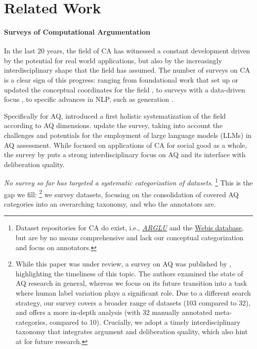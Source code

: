 \section{Related Work}
\label{sec:relatedwork}

\paragraph{Surveys of Computational Argumentation}

In the last 20 years, the field of CA has witnessed a constant development driven by the potential for real world applications, but also by the increasingly interdisciplinary shape that the field has assumed. The number of  surveys on CA is a clear sign of this progress: ranging from foundational work that set up or updated the conceptual coordinates for the field \cite{peldszus2013argument,stede_argumentation_2019,lawrence2020survey,lauscher2022survey}, to surveys with a data-driven focus \cite{cabrio2018survey,SchaeferStede+2021+45+58}, to specific advances in NLP, such as generation \citep{wang2023survey}. 

Specifically for AQ, \citet{wachsmuth-etal-2017-computational} introduced a first holistic systematization of the field according to AQ dimensions. \citet{wachsmuth-etal-2024-argument} update the survey, taking into account the challenges and potentials for the employment of large language models (LLMs) in AQ assessment. While focused on applications of CA for social good as a whole, the survey by \citet{vecchi-etal-2021-towards} puts a strong interdisciplinary focus on AQ and its interface with deliberation quality.

\textit{No survey so far has targeted a systematic categorization of datasets}.%
\footnote{Dataset repositories for CA do exist, i.e., \href{https://github.com/acidrobin/arglu-repo}{\textit{ARGLU}} and the \href{https://webis.de/data.html\#other-corpora}{Webis database}, but are by no means comprehensive and lack our conceptual categorization and focus on annotators.}
This is the gap we fill:%
\footnote{While this paper was under review, a survey on AQ was published by \citet{ivanova-etal-2024-lets}, highlighting the timeliness of this topic. The authors examined the state of AQ research in general, whereas we focus on its future transition into a task where human label variation plays a significant role. Due to a different search strategy, our survey covers a broader range of datasets (103 compared to 32), and offers a more in-depth analysis (with 32 manually annotated meta-categories, compared to 10). Crucially, we adopt a timely interdisciplinary taxonomy that integrates argument and deliberation quality, which \citet{ivanova-etal-2024-lets} also hint at for future research.} 
we survey {datasets}, focusing on the {consolidation of covered AQ categories into an overarching taxonomy}, and who the {annotators} are.


